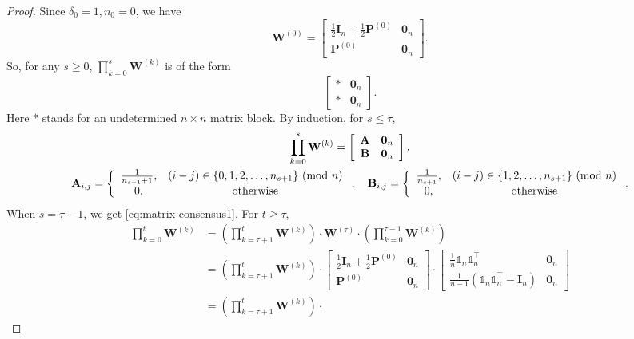 \documentclass{article}
\newcommand{\vzero}{\mathbf{0}}
\newcommand{\vA}{\mathbf{A}}
\newcommand{\vB}{\mathbf{B}}
\newcommand{\vI}{\mathbf{I}}
\newcommand{\vW}{\mathbf{W}}
\newcommand{\vP}{\mathbf{P}}
\newcommand{\ko}{{(k)}}
\newcommand{\bbone}{\mathds{1}}
\newcommand{\Mod}[1]{\ (\mathrm{mod}\ #1)}
\theoremstyle{plain}
\theoremstyle{definition}
\begin{document}
\begin{proof}
Since $\delta_0=1, n_0=0$, we have
$$
\vW^{(0)}=
\left[
\begin{array}{cc}
    \frac{1}{2}\vI_n+\frac{1}{2}\vP^{(0)} & \vzero_n \\
    \vP^{(0)} & \vzero_n
\end{array}
\right].
$$
So, for any $s\geq 0$, $\prod_{k=0}^s \vW^\ko$ is of the form 
$$
\left[
\begin{array}{cc}
    * & \vzero_n \\
    * & \vzero_n
\end{array}
\right].
$$
Here $*$ stands for an undetermined $n\times n$ matrix block. By induction, for $s\leq \tau$,
\begin{gather*}
\prod_{k=0}^s\vW^\ko =
\left[
\begin{array}{cc}
    \vA & \vzero_n \\
    \vB & \vzero_n
\end{array}
\right],\\
\vA_{i,j}=\left\{
\begin{array}{cc}
    \frac{1}{n_{s+1}+1}, & (i-j)\in\{0,1,2,\ldots,n_{s+1}\}\Mod{n} \\
    0, & \textup{otherwise}
\end{array}
\right.,\quad 
\vB_{i,j}=\left\{
\begin{array}{cc}
    \frac{1}{n_{s+1}}, & (i-j)\in\{1,2,\ldots,n_{s+1}\}\Mod{n}  \\
    0, & \textup{otherwise}
\end{array}
\right..
\end{gather*}
When $s=\tau-1$, we get \eqref{eq:matrix-consensus1}. For $t\geq \tau$,
\begin{align*}
\prod_{k=0}^t\vW^\ko&=
\left(\prod_{k=\tau+1}^{t}\vW^\ko\right)\cdot
\vW^{(\tau)}\cdot
\left(\prod_{k=0}^{\tau-1}\vW^\ko\right)\\
&=\left(\prod_{k=\tau+1}^{t}\vW^\ko\right)\cdot
\left[
\begin{array}{cc}
    \frac{1}{2}\vI_n+\frac{1}{2}\vP^{(0)} & \vzero_n \\
    \vP^{(0)} & \vzero_n
\end{array}
\right]\cdot
\left[
\begin{array}{cc}
    \frac{1}{n}\bbone_n\bbone_n^\top & \vzero_n \\
    \frac{1}{n-1}(\bbone_n\bbone_n^\top-\vI_n) & \vzero_n
\end{array}\right]\\
&=\left(\prod_{k=\tau+1}^{t}\vW^\ko\right)\cdot

\end{align*}
\end{proof}
\end{document}

